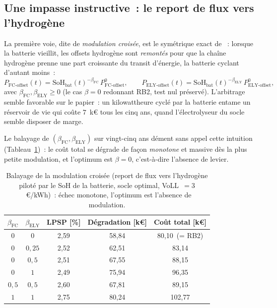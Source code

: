 \subsection{Une impasse instructive~: le report de flux vers l'hydrogène}
\label{subsec:cross_modulation}

La première voie, dite de \emph{modulation croisée}, est le symétrique exact de \RBsohH{}~: lorsque la batterie vieillit, les offsets hydrogène sont \emph{remontés} pour que la chaîne hydrogène prenne une part croissante du transit d'énergie, la batterie cyclant d'autant moins~:
\begin{equation}
\label{eq:cross_modulation}
P_{\text{FC-offset}}(t) = \mathrm{SoH}_{\text{bat}}(t)^{-\beta_{\text{FC}}}\,P_{\text{FC-offset}}^{0},
\qquad
P_{\text{ELY-offset}}(t) = \mathrm{SoH}_{\text{bat}}(t)^{-\beta_{\text{ELY}}}\,P_{\text{ELY-offset}}^{0},
\end{equation}
avec $\beta_{\text{FC}}, \beta_{\text{ELY}} \geq 0$ (le cas $\beta = 0$ redonnant RB2, test nul préservé). L'arbitrage semble favorable sur le papier~: un kilowattheure cyclé par la batterie entame un réservoir de vie qui coûte $7$~k€ tous les cinq ans, quand l'électrolyseur du socle semble disposer de marge.

Le balayage de $(\beta_{\text{FC}}, \beta_{\text{ELY}})$ sur vingt-cinq ans dément sans appel cette intuition (Tableau~\ref{tab:cross_modulation})~: le coût total se dégrade de façon \emph{monotone} et massive dès la plus petite modulation, et l'optimum est $\beta = 0$, c'est-à-dire l'absence de levier.

\begin{table}[h!]
\centering
\caption{Balayage de la modulation croisée (report de flux vers l'hydrogène piloté par le SoH de la batterie, socle optimal, VoLL~$=3$~€/kWh)~: échec monotone, l'optimum est l'absence de modulation.}
\label{tab:cross_modulation}
\begin{tabular}{ccccc}
\hline
$\beta_{\text{FC}}$ & $\beta_{\text{ELY}}$ & LPSP [\%] & Dégradation [k€] & Coût total [k€] \\
\hline
$0$ & $0$      & 2,59 & 58,84 & 80,10~(= RB2) \\
$0$ & $0{,}25$ & 2,52 & 62,51 & 83,14 \\
$0$ & $0{,}5$  & 2,51 & 67,55 & 88,15 \\
$0$ & $1$      & 2,49 & 75,94 & 96,35 \\
$0{,}5$ & $0{,}5$ & 2,60 & 67,81 & 89,15 \\
$1$ & $1$      & 2,75 & 80,24 & 102,77 \\
\hline
\end{tabular}
\end{table}

